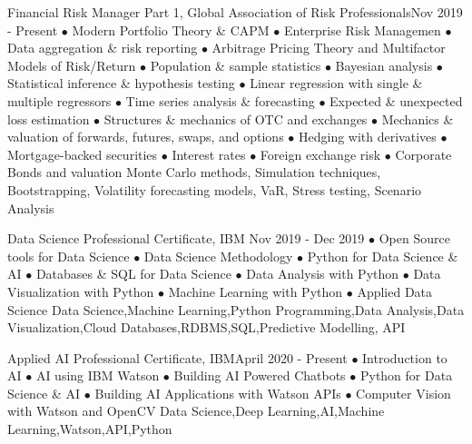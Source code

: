 \begin{prodevs}
 
     \prodev 
    {Financial Risk Manager Part 1, Global Association of Risk Professionals}{Nov 2019 - Present}
   {}
    {$\bullet$ Modern Portfolio Theory \& CAPM
    $\bullet$ Enterprise Risk Managemen $\bullet$ Data aggregation \& risk reporting  $\bullet$ Arbitrage Pricing Theory and Multifactor Models of Risk/Return 
    $\bullet$ Population \& sample statistics $\bullet$ Bayesian analysis
    $\bullet$ Statistical inference \& hypothesis testing
    $\bullet$ Linear regression with single \& multiple regressors
    $\bullet$ Time series analysis \& forecasting
    $\bullet$ Expected \& unexpected loss estimation  $\bullet$ Structures \& mechanics of OTC and exchanges $\bullet$ Mechanics \& valuation of forwards, futures, swaps, and options $\bullet$ Hedging with derivatives
    $\bullet$ Mortgage-backed securities
    $\bullet$ Interest rates
    $\bullet$  Foreign exchange risk $\bullet$ Corporate Bonds and valuation}
    {Monte Carlo methods, Simulation techniques, Bootstrapping, Volatility forecasting models, VaR, Stress testing, Scenario Analysis}
    
    \prodev 
    {Data Science Professional Certificate, IBM }{Nov 2019 - Dec 2019}
    {}
    {$\bullet$ Open Source tools for Data Science $\bullet$ Data Science Methodology $\bullet$ Python for Data Science \& AI $\bullet$ Databases \& SQL for Data Science $\bullet$ Data Analysis with Python $\bullet$ Data Visualization with Python $\bullet$ Machine Learning with Python $\bullet$ Applied Data Science}
    {Data Science,Machine Learning,Python Programming,Data Analysis,Data Visualization,Cloud Databases,RDBMS,SQL,Predictive Modelling, API}
   
   \prodev 
    {Applied AI Professional Certificate, IBM}{April 2020 - Present}
   {}
    {$\bullet$ Introduction to AI
    $\bullet$ AI using IBM Watson
    $\bullet$ Building AI Powered Chatbots
    $\bullet$ Python for Data Science \& AI
    $\bullet$ Building AI Applications with Watson APIs
    $\bullet$ Computer Vision with Watson and OpenCV}
    {Data Science,Deep Learning,AI,Machine Learning,Watson,API,Python}
    
\end{prodevs}

    